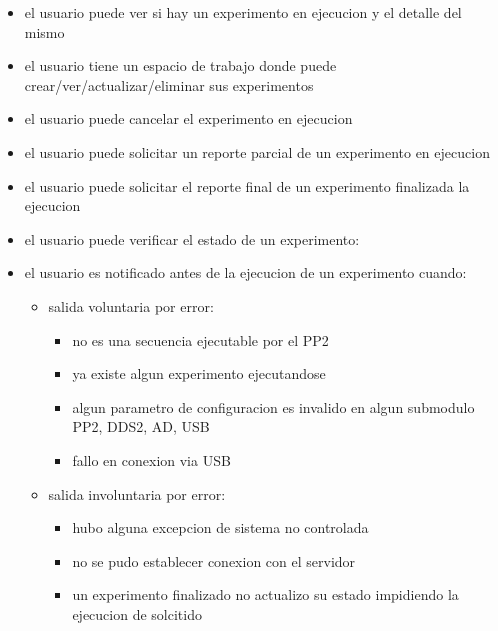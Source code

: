 \begin{itemize}
\item el usuario puede ver si hay un experimento en ejecucion y el detalle del mismo
\item el usuario tiene un espacio de trabajo donde puede crear/ver/actualizar/eliminar sus experimentos
\item el usuario puede cancelar el experimento en ejecucion
\item el usuario puede solicitar un reporte parcial de un experimento en ejecucion
\item el usuario puede solicitar el reporte final de un experimento finalizada la ejecucion
\item el usuario puede verificar el estado de un experimento:
\item el usuario es notificado antes de la ejecucion de un experimento cuando:
    \begin{itemize}
    \item salida voluntaria por error:
        \begin{itemize}
        \item no es una secuencia ejecutable por el PP2
        \item ya existe algun experimento ejecutandose
        \item algun parametro de configuracion es invalido en algun submodulo PP2, DDS2, AD, USB
        \item fallo en conexion via USB
        \end{itemize}
    \end{itemize}    
    \begin{itemize}    
    \item salida involuntaria por error:
        \begin{itemize}
        \item hubo alguna excepcion de sistema no controlada
        \item no se pudo establecer conexion con el servidor
        \item un experimento finalizado no actualizo su estado impidiendo la ejecucion de solcitido
        \end{itemize}
    \end{itemize}
\end{itemize}
